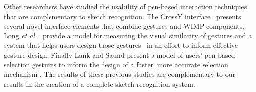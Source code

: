 \documentclass{egpubl}
\begin{document}
Other researchers have studied the usability of pen-based interaction
techniques that are complementary to sketch recognition.  The CrossY
interface~\cite{Apitz04CrossY} presents several novel interface
elements that combine gestures and WIMP components.  Long \textit{et
al.}~\cite{Long00VisualSimilarity} provide a model for measuring the
visual similarity of gestures and a system that helps users design
those gestures~\cite{Long2001Quill} in an effort to inform effective
gesture design.  Finally Lank and Saund present a model of users'
pen-based selection gestures to inform the design of a faster, more
accurate selection mechanism \cite{Lank2005Sloppy}.  The results of
these previous studies are complementary to our results in the
creation of a complete sketch recognition system.


\end{document}
